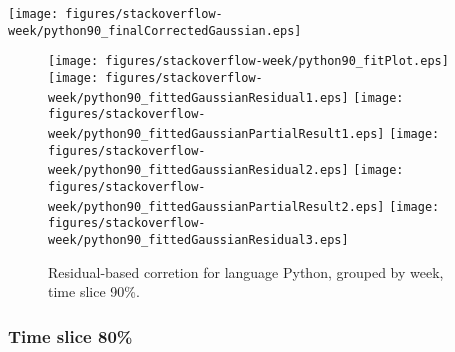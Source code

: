 \begin{center}
{\texttt{[image: figures/stackoverflow-week/python90\_finalCorrectedGaussian.eps]}}
\end{center}

\FloatBarrier

\begin{figure}[t]
\centering
{}
{\texttt{[image: figures/stackoverflow-week/python90\_fitPlot.eps]}}
{\texttt{[image: figures/stackoverflow-week/python90\_fittedGaussianResidual1.eps]}}
{\texttt{[image: figures/stackoverflow-week/python90\_fittedGaussianPartialResult1.eps]}}
{\texttt{[image: figures/stackoverflow-week/python90\_fittedGaussianResidual2.eps]}}
{\texttt{[image: figures/stackoverflow-week/python90\_fittedGaussianPartialResult2.eps]}}
{\texttt{[image: figures/stackoverflow-week/python90\_fittedGaussianResidual3.eps]}}
\caption{Residual-based corretion for language Python, grouped by week, time slice 90\%.}
\end{figure}


\FloatBarrier


\subsubsection{Time slice 80\%}

